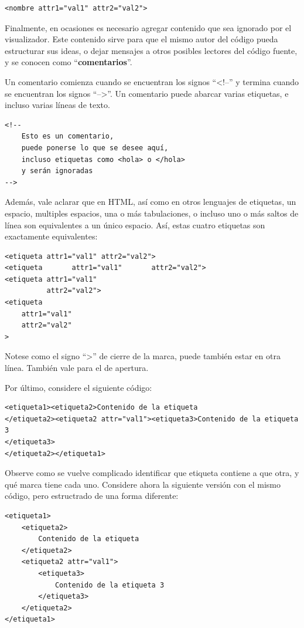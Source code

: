 \begin{lstlisting}[language=XHTML]
<nombre attr1="val1" attr2="val2">
\end{lstlisting}

Finalmente, en ocasiones es necesario agregar contenido que sea ignorado por
el visualizador. Este contenido sirve para que el mismo autor del código pueda
estructurar sus ideas, o dejar mensajes a otros posibles lectores del código
fuente, y se conocen como ``\textbf{comentarios}''.

Un comentario comienza cuando se encuentran los signos ``<!--'' y termina cuando 
se encuentran los signos ``-->''. Un comentario puede abarcar varias etiquetas,
e incluso varias líneas de texto.

\begin{lstlisting}[language=XHTML]
<!--
    Esto es un comentario,
    puede ponerse lo que se desee aquí, 
    incluso etiquetas como <hola> o </hola>
    y serán ignoradas
-->
\end{lstlisting}

Además, vale aclarar que en HTML, así como en otros lenguajes de etiquetas, un
espacio, multiples espacios, una o más tabulaciones, o incluso uno o más saltos
de línea son equivalentes a un único espacio. Así, estas cuatro etiquetas son
exactamente equivalentes:

\begin{lstlisting}[language=XHTML]
<etiqueta attr1="val1" attr2="val2">
<etiqueta       attr1="val1"       attr2="val2">
<etiqueta attr1="val1"
          attr2="val2">
<etiqueta
    attr1="val1"
    attr2="val2"
>
\end{lstlisting}

Notese como el signo ``>'' de cierre de la marca, puede también estar en otra línea.
También vale para el de apertura.

Por último, considere el siguiente código:
\begin{lstlisting}[language=XHTML]
<etiqueta1><etiqueta2>Contenido de la etiqueta
</etiqueta2><etiqueta2 attr="val1"><etiqueta3>Contenido de la etiqueta 3
</etiqueta3>
</etiqueta2></etiqueta1>
\end{lstlisting}

Observe como se vuelve complicado identificar que etiqueta contiene a que otra,
y qué marca tiene cada uno. Considere ahora la siguiente versión con el mismo
código, pero estructrado de una forma diferente:

\begin{lstlisting}[language=XHTML]
<etiqueta1>
    <etiqueta2>
        Contenido de la etiqueta
    </etiqueta2>
    <etiqueta2 attr="val1">
        <etiqueta3>
            Contenido de la etiqueta 3
        </etiqueta3>
    </etiqueta2>
</etiqueta1>
\end{lstlisting}


